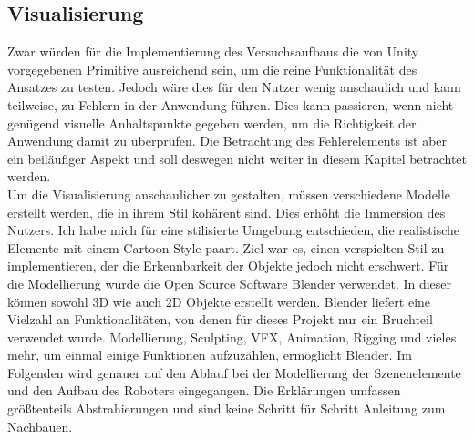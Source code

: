 \subsection{Visualisierung}
\label{visualisierung}
Zwar würden für die Implementierung des Versuchsaufbaus die von Unity vorgegebenen Primitive ausreichend sein, um die reine Funktionalität des Ansatzes zu testen. Jedoch wäre dies für den Nutzer wenig anschaulich und kann teilweise, zu Fehlern in der Anwendung führen. Dies kann passieren, wenn nicht genügend visuelle Anhaltspunkte gegeben werden, um die Richtigkeit der Anwendung damit zu überprüfen. Die Betrachtung des Fehlerelements ist aber ein beiläufiger Aspekt und soll deswegen nicht weiter in diesem Kapitel betrachtet werden. 
\\
Um die Visualisierung anschaulicher zu gestalten, müssen verschiedene Modelle erstellt werden, die in ihrem Stil kohärent sind. Dies erhöht die Immersion des Nutzers. Ich habe mich für eine stilisierte Umgebung entschieden, die realistische Elemente mit einem Cartoon Style paart. Ziel war es, einen verspielten Stil zu implementieren, der die Erkennbarkeit der Objekte jedoch nicht erschwert. 
Für die Modellierung wurde die Open Source Software Blender verwendet. In dieser können sowohl 3D wie auch 2D Objekte erstellt werden. Blender liefert eine Vielzahl an Funktionalitäten, von denen für dieses Projekt nur ein Bruchteil verwendet wurde. Modellierung, Sculpting, VFX, Animation, Rigging und vieles mehr, um einmal einige Funktionen aufzuzählen, ermöglicht Blender.\cite{ble} Im Folgenden wird genauer auf den Ablauf bei der Modellierung der Szenenelemente und den Aufbau des Roboters eingegangen. Die Erklärungen umfassen größtenteils Abstrahierungen und sind keine Schritt für Schritt Anleitung zum Nachbauen.

